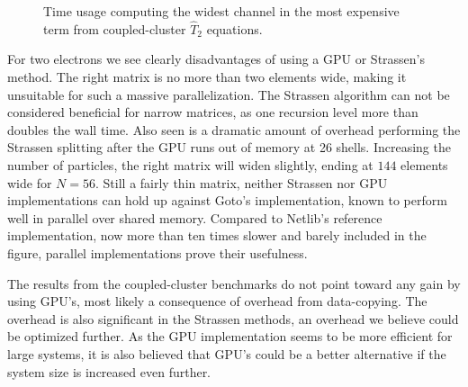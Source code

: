 \begin{figure}
\begin{center}
{}
\caption{Time usage computing the widest channel in the most expensive term from coupled-cluster $\hat{T}_2$ equations.}
\label{fig:results:timeMultCC}
\end{center}
\end{figure}

For two electrons we see clearly disadvantages of using a GPU or Strassen's method.
The right matrix is no more than two elements wide, making it unsuitable for such a massive parallelization.
The Strassen algorithm can not be considered beneficial for narrow matrices, as one recursion level more than doubles the wall time.
Also seen is a dramatic amount of overhead performing the Strassen splitting after the GPU runs out of memory at 26 shells.
Increasing the number of particles, the right matrix will widen slightly, ending at $144$ elements wide for $N=56$.
Still a fairly thin matrix, neither Strassen nor GPU implementations can hold up against Goto's implementation, known to perform well in parallel over shared memory.
Compared to Netlib's reference implementation, now more than ten times slower and barely included in the figure, parallel implementations prove their usefulness.


The results from the coupled-cluster benchmarks do not point toward any gain by using GPU's,
most likely a consequence of overhead from data-copying.
The overhead is also significant in the Strassen methods, an overhead we believe could be optimized further.
As the GPU implementation seems to be more efficient for large systems, it is also believed that GPU's could be a better alternative if the system size is increased even further.

